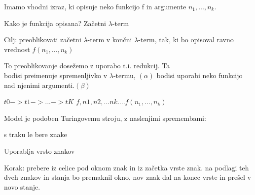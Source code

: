 \documentclass[10pt,a4paper,oneside]{book}
\begin{document}
Imamo vhodni izraz, ki opisuje neko funkcijo f in argumente $n_1, \dots, n_k$.

Kako je funkcija opisana?
Začetni $\lambda$-term

Cilj: preoblikovati začetni $\lambda$-term v končni $\lambda$-term, tak, ki bo opisoval ravno vrednost $f(n_1, \dots, n_k)$

To preoblikovanje dosežemo z uporabo t.i. redukcij. Ta\\
bodisi preimenuje spremenljivko v $\lambda$-termu, $(\alpha)$
bodisi uporabi neko funkcijo nad njenimi argumenti.$(\beta)$ %

$t0->t1->...->tK$
$f, n1, n2, ... nk$....$f(n_1, \dots, n_k)$





Model je podoben Turingovemu stroju, z naslenjimi spremembami:
\begin{items}
\item s traku le bere znake
\item Uporablja vrsto znakov
\end{items}

Korak: prebere iz celice pod oknom znak in iz začetka vrste znak. na podlagi teh dveh znakov in stanja bo premaknil okno, nov znak dal na konec vrste in prešel v novo stanje.

\end{document}
